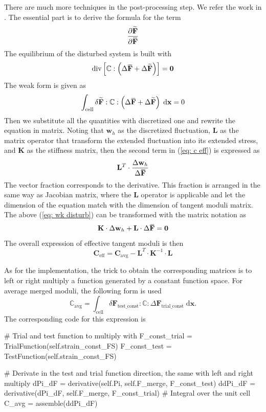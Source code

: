 \documentclass[10pt,a4paper]{scrreprt}
\newcommand{\myd}{\;\mathrm{d}}
\newcommand{\overbar}[1]{\mkern 1.5mu\overline{\mkern-1.5mu#1\mkern-1.5mu}\mkern 1.5mu}
\begin{document}
There are much more techniques in the post-processing step. We refer the work in \citep{SchKei:2012:tho}. The essential part is to derive the formula for the term 
\[
\dfrac{\partial \widetilde{\mathbf{F}}}{\partial \overbar{\mathbf{F}}}
\]
The equilibrium of the disturbed system is built with
\[
\text{div} \left[ \mathbb{C} : \left( \Delta \overbar{\mathbf{F}} + \Delta \widetilde{\mathbf{F}} \right) \right] = \mathbf{0}
\]
The weak form is given as
\begin{equation}
\label{eq: wk disturb}
\int_{\text{cell}} \delta \widetilde{\mathbf{F}} : \mathbb{C} : \left( \Delta \overbar{\mathbf{F}} + \Delta \widetilde{\mathbf{F}} \right) \myd{\mathbf{x}} = 0
\end{equation}
Then we substitute all the quantities with discretized one and rewrite the equation in matrix. Noting that $\mathbf{w}_{h}$ as the discretized fluctuation, $\mathbf{L}$ as the matrix operator that transform the extended fluctuation into its extended stress, and $\mathbf{K}$ as the stiffness matrix, then the second term in (\ref{eq: c eff}) is expressed as
\begin{equation}
\mathbf{L}^{T} \cdot \dfrac{\Delta \mathbf{w}_{h}}{\Delta \overbar{\mathbf{F}}} 
\end{equation}
The vector fraction corresponds to the derivative. This fraction is arranged in the same way as Jacobian matrix, where the $\mathbf{L}$ operator is applicable and let the dimension of the equation match with the dimension of tangent moduli matrix. The above (\ref{eq: wk disturb}) can be transformed with the matrix notation as
\begin{equation}
\mathbf{K} \cdot \Delta \mathbf{w}_{h} + \mathbf{L} \cdot \Delta \overbar{\mathbf{F}} = \mathbf{0}
\end{equation}
The overall expression of effective tangent moduli is then
\begin{equation}
\mathbf{C}_{\text{eff}} = \mathbf{C}_{\text{avg}} - \mathbf{L}^{T} \cdot \mathbf{K}^{-1} \cdot \mathbf{L}
\end{equation}

As for the implementation, the trick to obtain the corresponding matrices is to left or right multiply a function generated by a constant function space. For average merged moduli, the following form is used
\begin{equation}
\mathbb{C}_{\text{avg}} = \int_{\text{cell}} \delta \mathbf{F}_{ \text{test\_const}}: \mathbb{C} : \Delta \mathbf{F}_{\text{trial\_const}} \myd{\mathbf{x}}.
\end{equation}
The corresponding code for this expression is 
\begin{python}
# Trial and test function to multiply with
F_const_trial = TrialFunction(self.strain_const_FS)
F_const_test = TestFunction(self.strain_const_FS)

# Derivate in the test and trial function direction, the same with left and right multiply
dPi_dF = derivative(self.Pi, self.F_merge, F_const_test)
ddPi_dF = derivative(dPi_dF, self.F_merge, F_const_trial)
# Integral over the unit cell
C_avg = assemble(ddPi_dF)
\end{python}
\end{document}
